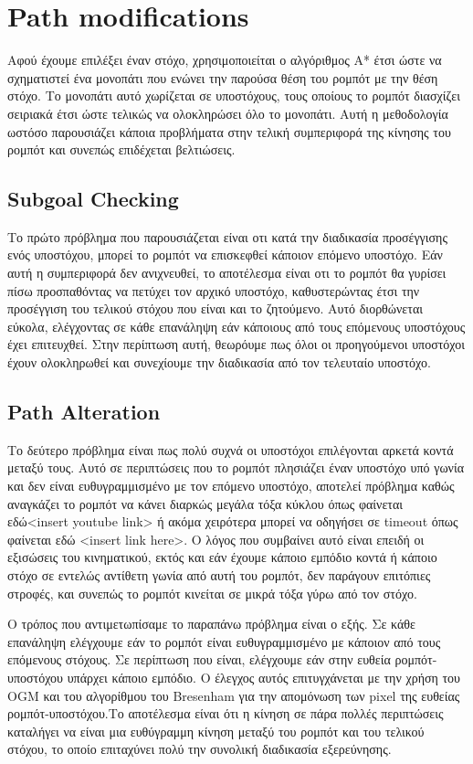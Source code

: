 \section*{Path modifications}
Αφού έχουμε επιλέξει έναν στόχο, χρησιμοποιείται ο αλγόριθμος A* έτσι ώστε να σχηματιστεί ένα μονοπάτι που ενώνει την παρούσα θέση του ρομπότ με την θέση στόχο. Το μονοπάτι αυτό χωρίζεται σε υποστόχους, τους οποίους το ρομπότ διασχίζει σειριακά έτσι ώστε τελικώς να ολοκληρώσει όλο το μονοπάτι. Αυτή η μεθοδολογία ωστόσο παρουσιάζει κάποια προβλήματα στην τελική συμπεριφορά της κίνησης του ρομπότ και συνεπώς επιδέχεται βελτιώσεις.

\subsection*{Subgoal Checking}

Το πρώτο πρόβλημα που παρουσιάζεται είναι οτι κατά την διαδικασία προσέγγισης ενός υποστόχου, μπορεί το ρομπότ να επισκεφθεί κάποιον επόμενο υποστόχο. Εάν αυτή η συμπεριφορά δεν ανιχνευθεί, το αποτέλεσμα είναι οτι το ρομπότ θα γυρίσει πίσω προσπαθόντας να πετύχει τον αρχικό υποστόχο, καθυστερώντας έτσι την προσέγγιση του τελικού στόχου που είναι και το ζητούμενο. Αυτό διορθώνεται εύκολα, ελέγχοντας σε κάθε επανάληψη εάν κάποιους από τους επόμενους υποστόχους έχει επιτευχθεί. Στην περίπτωση αυτή, θεωρόυμε πως όλοι οι προηγούμενοι υποστόχοι έχουν ολοκληρωθεί και συνεχίουμε την διαδικασία από τον τελευταίο υποστόχο.

\subsection*{Path Alteration}

Το δεύτερο πρόβλημα είναι πως πολύ συχνά οι υποστόχοι επιλέγονται αρκετά κοντά μεταξύ τους. Αυτό σε περιπτώσεις που το ρομπότ πλησιάζει έναν υποστόχο υπό γωνία και δεν είναι ευθυγραμμισμένο με τον επόμενο υποστόχο, αποτελεί πρόβλημα καθώς αναγκάζει το ρομπότ να κάνει διαρκώς μεγάλα τόξα κύκλου όπως φαίνεται εδώ<insert youtube link> ή ακόμα χειρότερα μπορεί να οδηγήσει σε timeout όπως φαίνεται εδώ <insert link here>. Ο λόγος που συμβαίνει αυτό είναι επειδή οι εξισώσεις του κινηματικού, εκτός και εάν έχουμε κάποιο εμπόδιο κοντά ή κάποιο στόχο σε εντελώς αντίθετη γωνία από αυτή του ρομπότ, δεν παράγουν επιτόπιες στροφές, και συνεπώς το ρομπότ κινείται σε μικρά τόξα γύρω από τον στόχο.

Ο τρόπος που αντιμετωπίσαμε το παραπάνω πρόβλημα είναι ο εξής. Σε κάθε επανάληψη ελέγχουμε εάν το ρομπότ είναι ευθυγραμμισμένο με κάποιον από τους επόμενους στόχους. Σε περίπτωση που είναι, ελέγχουμε εάν στην ευθεία ρομπότ-υποστόχου υπάρχει κάποιο εμπόδιο. Ο έλεγχος αυτός επιτυγχάνεται με την χρήση του OGM και του αλγορίθμου του Bresenham για την απομόνωση των pixel της ευθείας ρομπότ-υποστόχου.Το αποτέλεσμα είναι ότι η κίνηση σε πάρα πολλές περιπτώσεις καταλήγει να είναι μια ευθύγραμμη κίνηση μεταξύ του ρομπότ και του τελικού στόχου, το οποίο επιταχύνει πολύ την συνολική διαδικασία εξερεύνησης.

